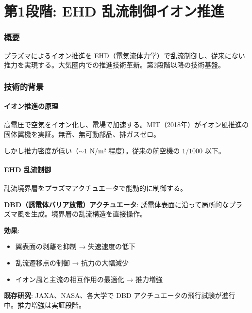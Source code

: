 \documentclass[11pt,a4paper]{article}
\begin{document}
\part{第1段階: EHD 乱流制御イオン推進}

\section{概要}

\begin{planbox}[第1段階の目標]
プラズマによるイオン推進を EHD（電気流体力学）で乱流制御し、従来にない推力を実現する。大気圏内での推進技術革新。第2段階以降の技術基盤。
\end{planbox}

\section{技術的背景}

\subsection{イオン推進の原理}

高電圧で空気をイオン化し、電場で加速する。MIT（2018年）がイオン風推進の固体翼機を実証。無音、無可動部品、排ガスゼロ。

しかし推力密度が低い（$\sim 1$ N/m² 程度）。従来の航空機の $1/1000$ 以下。

\subsection{EHD 乱流制御}

\begin{techbox}[核心技術]
乱流境界層をプラズマアクチュエータで能動的に制御する。

\textbf{DBD（誘電体バリア放電）アクチュエータ}: 誘電体表面に沿って局所的なプラズマ風を生成。境界層の乱流構造を直接操作。

\textbf{効果}:
\begin{itemize}
\item 翼表面の剥離を抑制 → 失速速度の低下
\item 乱流遷移点の制御 → 抗力の大幅減少
\item イオン風と主流の相互作用の最適化 → 推力増強
\end{itemize}

\textbf{既存研究}: JAXA、NASA、各大学で DBD アクチュエータの飛行試験が進行中。推力増強は実証段階。
\end{techbox}
\end{document}
